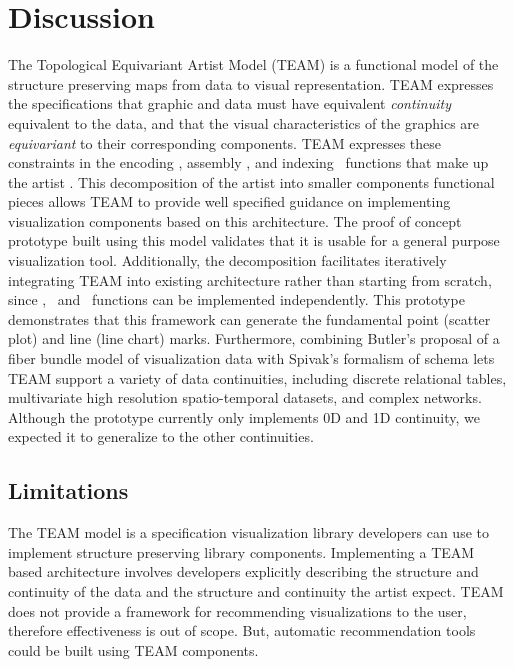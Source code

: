 \documentclass[../main.tex]{subfiles}
\begin{document}
\section{Discussion}
The Topological Equivariant Artist Model (TEAM) is a functional model of the structure preserving maps from data to visual representation. TEAM expresses the specifications that graphic and data must have equivalent \textit{continuity} equivalent to the data, and that the visual characteristics of the graphics are \textit{equivariant} to their corresponding components. TEAM expresses these constraints in the encoding \vchannel, assembly \vmark, and indexing \vindex\ functions that make up the artist \vartist. This decomposition of the artist into smaller components functional pieces allows TEAM to provide well specified guidance on implementing visualization components based on this architecture. The proof of concept prototype built using this model validates that it is usable for a general purpose visualization tool. Additionally, the decomposition facilitates iteratively integrating TEAM into existing architecture rather than starting from scratch, since \vchannel, \vmark\ and \vindex\ functions can be implemented independently. This prototype demonstrates that this framework can generate the fundamental point (scatter plot) and line (line chart) marks. Furthermore, combining Butler's proposal of a fiber bundle model of visualization data with Spivak's formalism of schema lets TEAM support a variety of data continuities, including  discrete relational tables, multivariate high resolution spatio-temporal datasets, and complex networks. Although the prototype currently only implements 0D and 1D continuity, we expected it to generalize to the other continuities. 

\subsection{Limitations}
The TEAM model is a specification visualization library developers can use to implement structure preserving library components. Implementing a TEAM based architecture involves developers explicitly describing the structure and continuity of the data and the structure and continuity the artist expect. TEAM does not provide a framework for recommending visualizations to the user,  therefore effectiveness \cite{mackinlayAutomaticDesignGraphical1987,chambersGraphicalMethodsData1983a} is out of scope. But, automatic recommendation tools could be built using TEAM components. 
\end{document}
